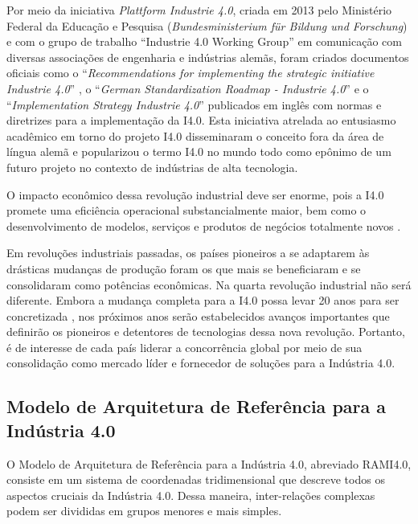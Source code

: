 \documentclass[
	12pt,				%
	oneside,			%
	a4paper,			%
	english,			%
	brazil				%
]{abntex2}
\begin{document}
	Por meio da iniciativa \textit{Plattform Industrie 4.0}, criada em 2013 pelo Ministério Federal da Educação e Pesquisa (\textit{Bundesministerium für Bildung und Forschung}) \cite{germany2019plattform} e com o grupo de trabalho ``Industrie 4.0 Working Group'' em comunicação com diversas associações de engenharia e indústrias alemãs, foram criados documentos oficiais como o ``\textit{Recommendations for implementing the strategic initiative Industrie 4.0}'' \cite{kagermann2013recommendations}, o ``\textit{German Standardization Roadmap - Industrie 4.0}'' \cite{adolph2018roadmap} e o ``\textit{Implementation Strategy Industrie 4.0}'' \cite{bitkom2016implementation} publicados em inglês com normas e diretrizes para a implementação da I4.0. Esta iniciativa atrelada ao entusiasmo acadêmico em torno do projeto I4.0 disseminaram o conceito fora da área de língua alemã e popularizou o termo I4.0 no mundo todo como epônimo de um futuro projeto no contexto de indústrias de alta tecnologia.

	O impacto econômico dessa revolução industrial deve ser enorme, pois a I4.0 promete uma eficiência operacional substancialmente maior, bem como o desenvolvimento de modelos, serviços e produtos de negócios totalmente novos \cite{hermann2016design}.
	
	Em revoluções industriais passadas, os países pioneiros a se adaptarem às drásticas mudanças de produção foram os que mais se beneficiaram e se consolidaram como potências econômicas. Na quarta revolução industrial não será diferente. Embora a mudança completa para a I4.0 possa levar 20 anos para ser concretizada \cite{russmann2015industryfour}, nos próximos anos serão estabelecidos avanços importantes que definirão os pioneiros e detentores de tecnologias dessa nova revolução. Portanto, é de interesse de cada país liderar a concorrência global por meio de sua consolidação como mercado líder e fornecedor de soluções para a Indústria 4.0.

	\pagebreak
	\subsection{Modelo de Arquitetura de Referência para a Indústria 4.0}
	
	O Modelo de Arquitetura de Referência para a Indústria 4.0, abreviado RAMI4.0, consiste em um sistema de coordenadas tridimensional que descreve todos os aspectos cruciais da Indústria 4.0. Dessa maneira, inter-relações complexas podem ser divididas em grupos menores e mais simples.
	
\end{document}
